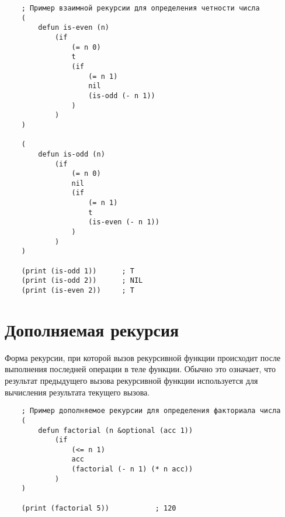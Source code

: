 \newpage

\begin{lstlisting}
    ; Пример взаимной рекурсии для определения четности числа
    (
        defun is-even (n)
            (if 
                (= n 0)
                t
                (if 
                    (= n 1)
                    nil
                    (is-odd (- n 1))
                )
            )
    )
    
    (
        defun is-odd (n)
            (if 
                (= n 0)
                nil
                (if 
                    (= n 1)
                    t
                    (is-even (- n 1))
                )
            )
    )
    
    (print (is-odd 1))      ; T
    (print (is-odd 2))      ; NIL
    (print (is-even 2))     ; T
\end{lstlisting}

\section{Дополняемая рекурсия}

Форма рекурсии, при которой вызов рекурсивной функции происходит после выполнения последней операции в теле функции. Обычно это означает, что результат предыдущего вызова рекурсивной функции используется для вычисления результата текущего вызова.

\begin{lstlisting}
    ; Пример дополняемое рекурсии для определения факториала числа
    (
        defun factorial (n &optional (acc 1))
            (if 
                (<= n 1)
                acc
                (factorial (- n 1) (* n acc))
            )
    )

    (print (factorial 5))           ; 120 
\end{lstlisting}
